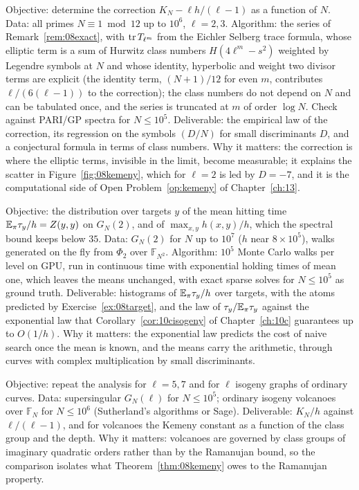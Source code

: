 \begin{compproblem}\label{cp:08second}
Objective: determine the correction $K_N-\ell h/(\ell-1)$ as a function of $N$. Data: all primes $N\equiv1\bmod12$ up to $10^6$, $\ell=2,3$. Algorithm: the series of Remark~\ref{rem:08exact}, with $\operatorname{tr} T_{\ell^m}$ from the Eichler Selberg trace formula, whose elliptic term is a sum of Hurwitz class numbers $H(4\ell^m-s^2)$ weighted by Legendre symbols at $N$ and whose identity, hyperbolic and weight two divisor terms are explicit (the identity term, $(N+1)/12$ for even $m$, contributes $\ell/(6(\ell-1))$ to the correction); the class numbers do not depend on $N$ and can be tabulated once, and the series is truncated at $m$ of order $\log N$. Check against PARI/GP spectra for $N\le10^5$. Deliverable: the empirical law of the correction, its regression on the symbols $(D/N)$ for small discriminants $D$, and a conjectural formula in terms of class numbers. Why it matters: the correction is where the elliptic terms, invisible in the limit, become measurable; it explains the scatter in Figure~\ref{fig:08kemeny}, which for $\ell=2$ is led by $D=-7$, and it is the computational side of Open Problem~\ref{op:kemeny} of Chapter~\ref{ch:13}.
\end{compproblem}

\begin{compproblem}
Objective: the distribution over targets $y$ of the mean hitting time $\mathbb{E}_\pi\tau_y/h=Z(y,y)$ on $G_N(2)$, and of $\max_{x,y}h(x,y)/h$, which the spectral bound keeps below $35$. Data: $G_N(2)$ for $N$ up to $10^7$ ($h$ near $8\times10^5$), walks generated on the fly from $\Phi_2$ over $\mathbb F_{N^2}$. Algorithm: $10^5$ Monte Carlo walks per level on GPU, run in continuous time with exponential holding times of mean one, which leaves the means unchanged, with exact sparse solves for $N\le10^5$ as ground truth. Deliverable: histograms of $\mathbb{E}_\pi\tau_y/h$ over targets, with the atoms predicted by Exercise~\ref{ex:08target}, and the law of $\tau_y/\mathbb{E}_\pi\tau_y$ against the exponential law that Corollary~\ref{cor:10cisogeny} of Chapter~\ref{ch:10c} guarantees up to $O(1/h)$. Why it matters: the exponential law predicts the cost of naive search once the mean is known, and the means carry the arithmetic, through curves with complex multiplication by small discriminants.
\end{compproblem}

\begin{compproblem}
Objective: repeat the analysis for $\ell=5,7$ and for $\ell$ isogeny graphs of ordinary curves. Data: supersingular $G_N(\ell)$ for $N\le10^5$; ordinary isogeny volcanoes over $\mathbb F_N$ for $N\le10^6$ (Sutherland's algorithms or Sage). Deliverable: $K_N/h$ against $\ell/(\ell-1)$, and for volcanoes the Kemeny constant as a function of the class group and the depth. Why it matters: volcanoes are governed by class groups of imaginary quadratic orders rather than by the Ramanujan bound, so the comparison isolates what Theorem~\ref{thm:08kemeny} owes to the Ramanujan property.
\end{compproblem}

